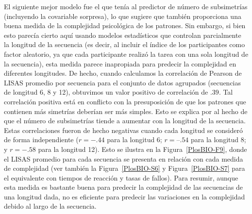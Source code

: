 El siguiente mejor modelo fue el que tenía al predictor de número de subsimetrías (incluyendo la covariable sorpresa), lo que sugiere que también proporciona una buena medida de la complejidad psicológica de los patrones. Sin embargo, si bien esto parecía cierto aquí usando modelos estadísticos que controlan parcialmente la longitud de la secuencia (es decir, al incluir el índice de los participantes como factor aleatorio, ya que cada participante realizó la tarea con una sola longitud de la secuencia), esta medida parece inapropiada para predecir la complejidad en diferentes longitudes. De hecho, cuando calculamos la correlación de Pearson de LISAS promedio por secuencia para el conjunto de datos agrupados (secuencias de longitud 6, 8 y 12), obtuvimos un valor positivo de correlación de $.39$. Tal correlación positiva está en conflicto con la presuposición de que los patrones que contienen más simetrías deberían ser más simples. Esto se explica por al hecho de que el número de subsimetrías tiende a aumentar con la longitud de la secuencia. Estas correlaciones fueron de hecho negativas cuando cada longitud se consideró de forma independiente ($r = -.44$ para la longitud 6; $r= –.54$ para la longitud 8; y $r = -.58$ para la longitud 12). Esto se ilustra en la Figura~\ref{PlosBIO-F9}, donde el LISAS promedio para cada secuencia se presenta en relación con cada medida de complejidad (ver también la Figura~\ref{PlosBIO-S6} y Figura~\ref{PlosBIO-S7} para el equivalente con tiempos de reacción y tasas de fallos). Para resumir, aunque esta medida es bastante buena para predecir la complejidad de las secuencias de una longitud dada, no es eficiente para predecir las variaciones en la complejidad debido al largo de la secuencia.


